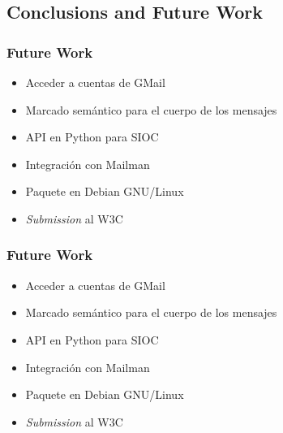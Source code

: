 \documentclass[spanish,notes=hide]{beamer}
\begin{document}
\subsection{Conclusions and Future Work}
\frame
{
  \frametitle{Future Work}
  \begin{itemize}
   \item \begin{Large}Acceder a cuentas de GMail\end{Large}
   \item \begin{Large}Marcado semántico para el cuerpo de los mensajes\end{Large}
   \item \begin{Large}API en Python para SIOC\end{Large}
   \item \begin{Large}Integración con Mailman\end{Large}
   \item \begin{Large}Paquete en Debian GNU/Linux\end{Large}
   \item \begin{Large}\textit{Submission} al W3C\end{Large}
  \end{itemize}

  \frametitle{Future Work}
  \begin{itemize}
   \item \begin{Large}Acceder a cuentas de GMail\end{Large}
   \item \begin{Large}Marcado semántico para el cuerpo de los mensajes\end{Large}
   \item \begin{Large}API en Python para SIOC\end{Large}
   \item \begin{Large}Integración con Mailman\end{Large}
   \item \begin{Large}Paquete en Debian GNU/Linux\end{Large}
   \item \begin{Large}\textit{Submission} al W3C\end{Large}
  \end{itemize}
}
\end{document}
